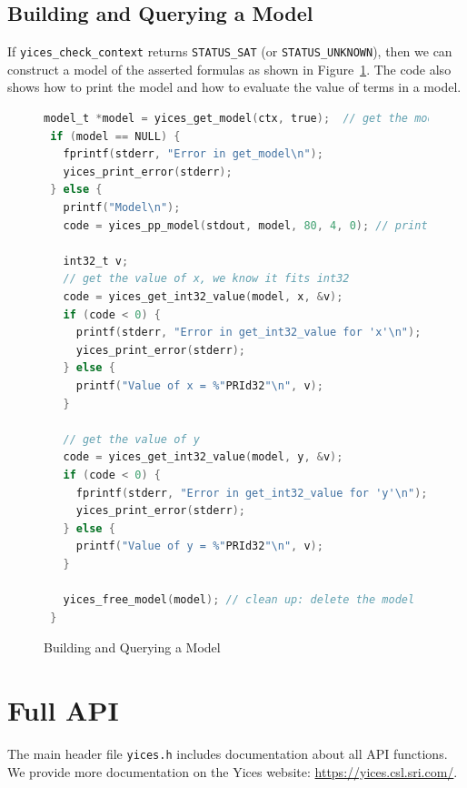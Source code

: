 \documentclass[11pt,twoside,fleqn,openright,titlepage]{cslreport}
\begin{document}
\subsection*{Building and Querying a Model}

If \texttt{yices\_check\_context} returns \texttt{STATUS\_SAT} (or
\texttt{STATUS\_UNKNOWN}), then we can construct a model of the
asserted formulas as shown in Figure~\ref{model-query}. The code also
shows how to print the model and how to evaluate the value of terms in
a model.

\begin{figure}
\begin{footnotesize}
\begin{lstlisting}[language=C,morekeywords={model_t,int32_t,NULL},stringstyle=\color{red},commentstyle=\color{olive}]
 model_t *model = yices_get_model(ctx, true);  // get the model
 if (model == NULL) {
   fprintf(stderr, "Error in get_model\n");
   yices_print_error(stderr);
 } else {
   printf("Model\n");
   code = yices_pp_model(stdout, model, 80, 4, 0); // print the model

   int32_t v;
   // get the value of x, we know it fits int32
   code = yices_get_int32_value(model, x, &v);
   if (code < 0) {
     printf(stderr, "Error in get_int32_value for 'x'\n");
     yices_print_error(stderr);
   } else {
     printf("Value of x = %"PRId32"\n", v);
   }

   // get the value of y
   code = yices_get_int32_value(model, y, &v);
   if (code < 0) {
     fprintf(stderr, "Error in get_int32_value for 'y'\n");
     yices_print_error(stderr);
   } else {
     printf("Value of y = %"PRId32"\n", v);
   }

   yices_free_model(model); // clean up: delete the model
 }
\end{lstlisting}
\end{footnotesize}
\caption{Building and Querying a Model}
\label{model-query}
\end{figure}


\section{Full API}

The main header file \texttt{yices.h} includes documentation about all
API functions. We provide more documentation on the Yices website:
\url{https://yices.csl.sri.com/}.

\newpage


\end{document}

